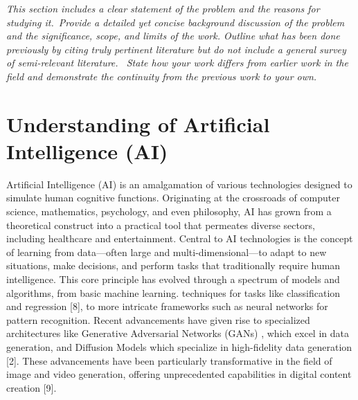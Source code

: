 \documentclass[11pt,a4paper,oneside]{report}
\newcommand{\instructions}[1]{{\color{black}\itshape #1}}
\begin{document}
\instructions{This section includes a clear statement of the problem and the
reasons for studying it.~Provide a detailed yet concise background
discussion of the problem and the significance, scope, and limits of the
work. Outline what has been done previously by citing truly pertinent
literature but do not include a general survey of semi-relevant
literature.~ State how your work differs from earlier work in the field
and demonstrate the continuity from the previous work to your own.

\section{Understanding of Artificial Intelligence (AI)}
Artificial Intelligence (AI) is an amalgamation of various technologies designed to simulate human cognitive functions. 
Originating at the crossroads of computer science, mathematics, psychology, and even philosophy, 
AI has grown from a theoretical construct into a practical tool that permeates diverse sectors, 
including healthcare and entertainment. 
Central to AI technologies is the concept of learning from data—often large and multi-dimensional—to adapt to new situations, make decisions, and perform tasks that traditionally require human intelligence. 
This core principle has evolved through a spectrum of models and algorithms, from basic machine learning. 
techniques for tasks like classification and regression [8], to more intricate frameworks such as neural networks for pattern recognition. 
Recent advancements have given rise to specialized architectures like Generative Adversarial Networks (GANs) \cite{granot2022drop}, which excel in data generation, and Diffusion Models which specialize in high-fidelity data generation [2]. 
These advancements have been particularly transformative in the field of image and video generation, offering unprecedented capabilities in digital content creation [9]. 

}
\end{document}
